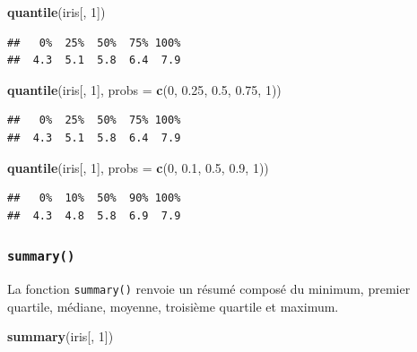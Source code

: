 \documentclass[
]{book}
\newenvironment{Shaded}{\begin{snugshade}}{\end{snugshade}}
\newcommand{\DataTypeTok}[1]{\textcolor[rgb]{0.13,0.29,0.53}{#1}}
\newcommand{\DecValTok}[1]{\textcolor[rgb]{0.00,0.00,0.81}{#1}}
\newcommand{\FloatTok}[1]{\textcolor[rgb]{0.00,0.00,0.81}{#1}}
\newcommand{\KeywordTok}[1]{\textcolor[rgb]{0.13,0.29,0.53}{\textbf{#1}}}
\newcommand{\NormalTok}[1]{#1}
\begin{document}
\begin{Shaded}
\begin{Highlighting}[]
\KeywordTok{quantile}\NormalTok{(iris[, }\DecValTok{1}\NormalTok{])}
\end{Highlighting}
\end{Shaded}

\begin{verbatim}
##   0%  25%  50%  75% 100% 
##  4.3  5.1  5.8  6.4  7.9
\end{verbatim}

\begin{Shaded}
\begin{Highlighting}[]
\KeywordTok{quantile}\NormalTok{(iris[, }\DecValTok{1}\NormalTok{], }\DataTypeTok{probs =} \KeywordTok{c}\NormalTok{(}\DecValTok{0}\NormalTok{, }\FloatTok{0.25}\NormalTok{, }\FloatTok{0.5}\NormalTok{, }\FloatTok{0.75}\NormalTok{, }\DecValTok{1}\NormalTok{))}
\end{Highlighting}
\end{Shaded}

\begin{verbatim}
##   0%  25%  50%  75% 100% 
##  4.3  5.1  5.8  6.4  7.9
\end{verbatim}

\begin{Shaded}
\begin{Highlighting}[]
\KeywordTok{quantile}\NormalTok{(iris[, }\DecValTok{1}\NormalTok{], }\DataTypeTok{probs =} \KeywordTok{c}\NormalTok{(}\DecValTok{0}\NormalTok{, }\FloatTok{0.1}\NormalTok{, }\FloatTok{0.5}\NormalTok{, }\FloatTok{0.9}\NormalTok{, }\DecValTok{1}\NormalTok{))}
\end{Highlighting}
\end{Shaded}

\begin{verbatim}
##   0%  10%  50%  90% 100% 
##  4.3  4.8  5.8  6.9  7.9
\end{verbatim}

\hypertarget{l015summary}{%
\subsubsection{\texorpdfstring{\texttt{summary()}}{summary()}}\label{l015summary}}

La fonction \texttt{summary()} renvoie un résumé composé du minimum, premier quartile, médiane, moyenne, troisième quartile et maximum.

\begin{Shaded}
\begin{Highlighting}[]
\KeywordTok{summary}\NormalTok{(iris[, }\DecValTok{1}\NormalTok{])}
\end{Highlighting}
\end{Shaded}
\end{document}
